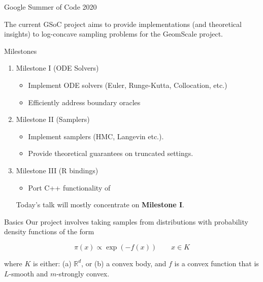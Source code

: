 \documentclass{beamer}
\begin{document}
\begin{frame}{Google Summer of Code 2020}

The current GSoC project aims to provide implementations (and theoretical insights) to log-concave sampling problems for the GeomScale project.

Milestones 

\begin{enumerate}
    \item Milestone I (ODE Solvers)
    \begin{itemize}
        \item Implement ODE solvers (Euler, Runge-Kutta, Collocation, etc.)
        \item Efficiently address boundary oracles
    \end{itemize}
    \item Milestone II (Samplers) 
    \begin{itemize}
        \item Implement samplers (HMC, Langevin etc.).  
        \item Provide theoretical guarantees on truncated settings. 
    \end{itemize}
    
    \item Milestone III (R bindings)
    \begin{itemize}
        \item Port C++ functionality of 
    \end{itemize}
    
    
    Today's talk will mostly concentrate on \textbf{Milestone I}.
    
\end{enumerate}


    
\end{frame}

\begin{frame}{Basics}
    Our project involves taking samples from distributions with probability density functions of the form
    
    $$\pi(x) \propto \exp(-f(x)) \qquad x \in K$$ 
    
    where $K$ is either: (a) $\mathbb R^d$, or (b) a convex body, and $f$ is a convex function that is $L$-smooth and $m$-strongly convex. 

\end{frame}
\end{document}
